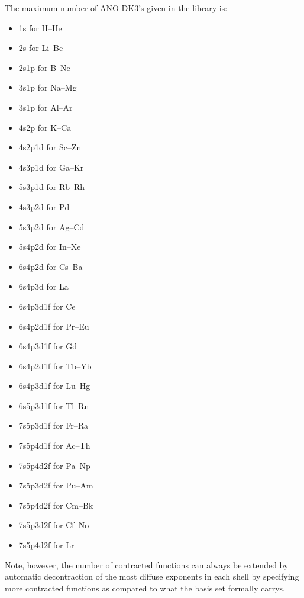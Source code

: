 The maximum number of ANO-DK3's given in the library is:
\begin{itemize}
\item 1s for H--He
\item 2s for Li--Be
\item 2s1p for B--Ne
\item 3s1p for Na--Mg
\item 3s1p for Al--Ar
\item 4s2p for K--Ca
\item 4s2p1d for Sc--Zn
\item 4s3p1d for Ga--Kr
\item 5s3p1d for Rb--Rh
\item 4s3p2d for Pd
\item 5s3p2d for Ag--Cd
\item 5s4p2d for In--Xe
\item 6s4p2d for Cs--Ba
\item 6s4p3d for La
\item 6s4p3d1f for Ce
\item 6s4p2d1f for Pr--Eu
\item 6s4p3d1f for Gd
\item 6s4p2d1f for Tb--Yb  
\item 6s4p3d1f for Lu--Hg
\item 6s5p3d1f for Tl--Rn
\item 7s5p3d1f for Fr--Ra
\item 7s5p4d1f for Ac--Th
\item 7s5p4d2f for Pa--Np
\item 7s5p3d2f for Pu--Am
\item 7s5p4d2f for Cm--Bk
\item 7s5p3d2f for Cf--No
\item 7s5p4d2f for Lr
\end{itemize}
Note, however, the number of contracted functions can always be extended by automatic decontraction of the most
diffuse exponents in each shell by specifying more contracted functions as compared to what the basis set formally carrys.

